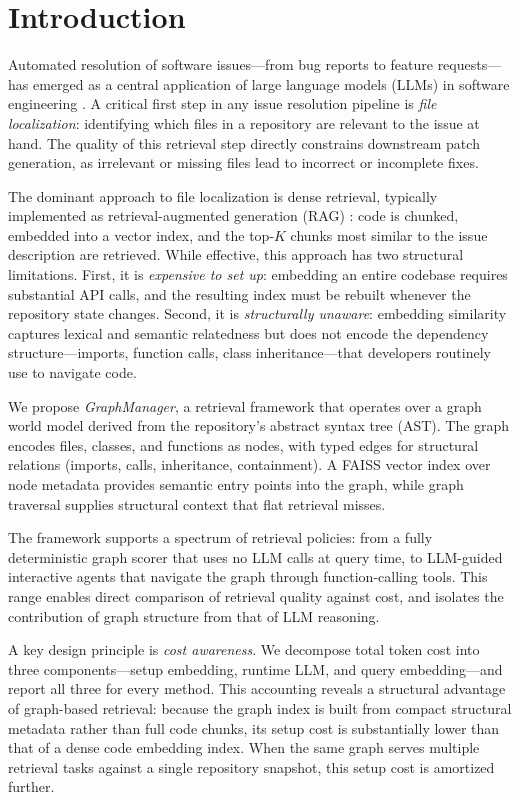 \section{Introduction}
\label{sec:introduction}

Automated resolution of software issues---from bug reports to feature requests---has emerged as a central application of large language models (LLMs) in software engineering \citep{swebench2024, yang2024sweagent, xia2024agentless, zhang2024autocoderover}. A critical first step in any issue resolution pipeline is \emph{file localization}: identifying which files in a repository are relevant to the issue at hand. The quality of this retrieval step directly constrains downstream patch generation, as irrelevant or missing files lead to incorrect or incomplete fixes.

The dominant approach to file localization is dense retrieval, typically implemented as retrieval-augmented generation (RAG) \citep{lewis2020rag}: code is chunked, embedded into a vector index, and the top-$K$ chunks most similar to the issue description are retrieved. While effective, this approach has two structural limitations. First, it is \emph{expensive to set up}: embedding an entire codebase requires substantial API calls, and the resulting index must be rebuilt whenever the repository state changes. Second, it is \emph{structurally unaware}: embedding similarity captures lexical and semantic relatedness but does not encode the dependency structure---imports, function calls, class inheritance---that developers routinely use to navigate code.

We propose \emph{GraphManager}, a retrieval framework that operates over a graph world model derived from the repository's abstract syntax tree (AST). The graph encodes files, classes, and functions as nodes, with typed edges for structural relations (imports, calls, inheritance, containment). A FAISS vector index over node metadata provides semantic entry points into the graph, while graph traversal supplies structural context that flat retrieval misses.

The framework supports a spectrum of retrieval policies: from a fully deterministic graph scorer that uses no LLM calls at query time, to LLM-guided interactive agents that navigate the graph through function-calling tools. This range enables direct comparison of retrieval quality against cost, and isolates the contribution of graph structure from that of LLM reasoning.

A key design principle is \emph{cost awareness}. We decompose total token cost into three components---setup embedding, runtime LLM, and query embedding---and report all three for every method. This accounting reveals a structural advantage of graph-based retrieval: because the graph index is built from compact structural metadata rather than full code chunks, its setup cost is substantially lower than that of a dense code embedding index. When the same graph serves multiple retrieval tasks against a single repository snapshot, this setup cost is amortized further.

